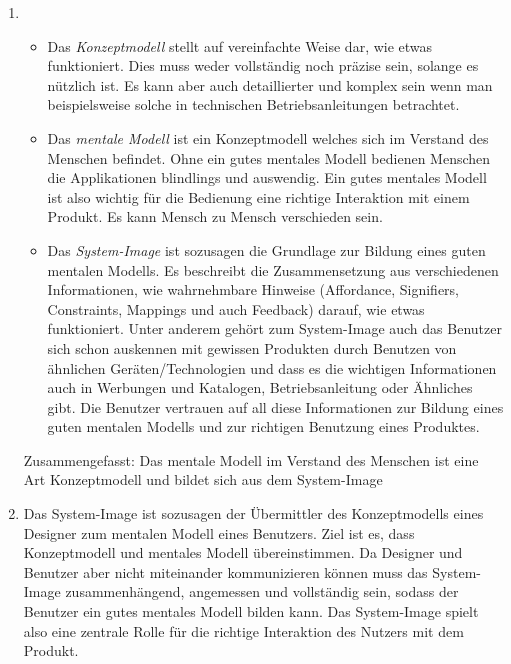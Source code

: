 \begin{enumerate}[label=\alph*)]

    \item  \begin{itemize}
                 \item Das \textit{Konzeptmodell} stellt auf vereinfachte Weise dar, wie etwas funktioniert. 
                 Dies muss weder vollständig noch präzise sein, solange es nützlich ist. Es kann aber auch detaillierter 
                 und komplex sein wenn man beispielsweise solche in technischen Betriebsanleitungen betrachtet.

                 \item Das \textit{mentale Modell} ist ein Konzeptmodell welches sich im Verstand des Menschen befindet.
                 Ohne ein gutes mentales Modell bedienen Menschen die Applikationen blindlings und auswendig. Ein gutes 
                 mentales Modell ist also wichtig für die Bedienung eine richtige Interaktion mit einem Produkt. Es kann
                 Mensch zu Mensch verschieden sein.

                 \item Das \textit{System-Image} ist sozusagen die Grundlage zur Bildung eines guten mentalen Modells. Es 
                 beschreibt die Zusammensetzung aus verschiedenen Informationen, wie wahrnehmbare Hinweise (Affordance, Signifiers,
                 Constraints, Mappings und auch Feedback) darauf, wie etwas funktioniert. Unter anderem gehört zum System-Image auch
                das Benutzer sich schon auskennen mit gewissen Produkten durch Benutzen von ähnlichen Geräten/Technologien und dass es 
                die wichtigen Informationen auch in Werbungen und Katalogen, Betriebsanleitung oder Ähnliches gibt. Die Benutzer vertrauen auf
                all diese Informationen zur Bildung eines guten mentalen Modells und zur richtigen Benutzung eines Produktes.
  \end{itemize}
  
        Zusammengefasst: Das mentale Modell im Verstand des Menschen ist eine Art Konzeptmodell und bildet sich aus dem System-Image
        
  

    \item  Das System-Image ist sozusagen der Übermittler des Konzeptmodells eines Designer zum mentalen Modell eines Benutzers.
    Ziel ist es, dass Konzeptmodell und mentales Modell übereinstimmen. Da Designer und Benutzer aber nicht miteinander 
    kommunizieren können muss das System-Image zusammenhängend, angemessen und vollständig sein,
    sodass der Benutzer ein gutes mentales Modell bilden kann. Das System-Image spielt also eine zentrale Rolle für die
    richtige Interaktion des Nutzers mit dem Produkt.


\end{enumerate}